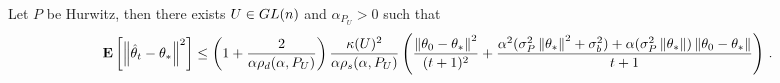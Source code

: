 \begin{comment}
\begin{theorem}\label{th:pdrate}
Let $P^A$ in \Cref{assmp:lsa}-~\ref{dist} be a positive definite distribution over $\C^{\dcd}$. Then
\begin{align*}
\EE{\norm{\thh_t-\ts}^2}
\leq
\left(1+\frac2{\alpha\rhod{P}}\right)\frac{1}{\alpha \rhos{P}}
\left(\frac{\norm{\theta_0-\ts}^2}{(t+1)^2}+ \frac{\alpha^2(\sigma_P^2\norm{\ts}^2+\sigma_b^2)+\alpha (\sigma_P^2\norm{\ts})\norm{\theta_0-\ts}}{t+1} \right)\,.
\end{align*}

\end{theorem}
\begin{theorem}\label{thm:simtran}[Change of Basis]
Let $P$ in \Cref{assmp:lsa}-~\ref{dist} be AS. Define $\gamma_t\eqdef U^{-1}\theta_t,\,,\gamma^*\eqdef U^{-1}\ts$, and suppose if $P_U$ is positive definite, then
\begin{align*}
\EE{\norm{\gh_t-\gamma^*}^2}
\leq
\left(1+\frac2{\alpha\rhod{P_U}}\right)\frac{\norm{U^{-1}}^2}{\alpha \rhos{P_U}}
\left(\frac{\norm{\theta_0-\ts}^2}{(t+1)^2}+ \frac{\alpha^2(\sigma_P^2\norm{\ts}^2+\sigma_b^2)+\alpha (\sigma_P^2\norm{\ts})\norm{\theta_0-\ts}}{t+1} \right)\,.
\end{align*}
where $\gh_t=\frac{1}{t+1}\sum_{s=0}^t \gamma_s$.
\end{theorem}
\end{comment}

\begin{theorem}\label{th:rate}
Let $P$ be Hurwitz, then there exists $U\in GL(n)$ and $\alpha_{P_U}>0$ such that
\begin{align*}
\mathbf{E}\left[\left\| \hat{\theta}_t-\theta_*\right\|^2\right]
\leq
\left(1+\frac2{\alpha\rho_d(\alpha,P_U)}\right)\frac{\kappa(U)^2}{\alpha \rho_s(\alpha,P_U)}
\left(\frac{\left\| \theta_0-\theta_*\right\|^2}{(t+1)^2}+ \frac{\alpha^2(\sigma_P^2\left\| \theta_*\right\|^2+\sigma_b^2)+\alpha (\sigma_P^2\left\| \theta_*\right\|)\left\| \theta_0-\theta_*\right\|}{t+1} \right)\,.
\end{align*}
\end{theorem}

